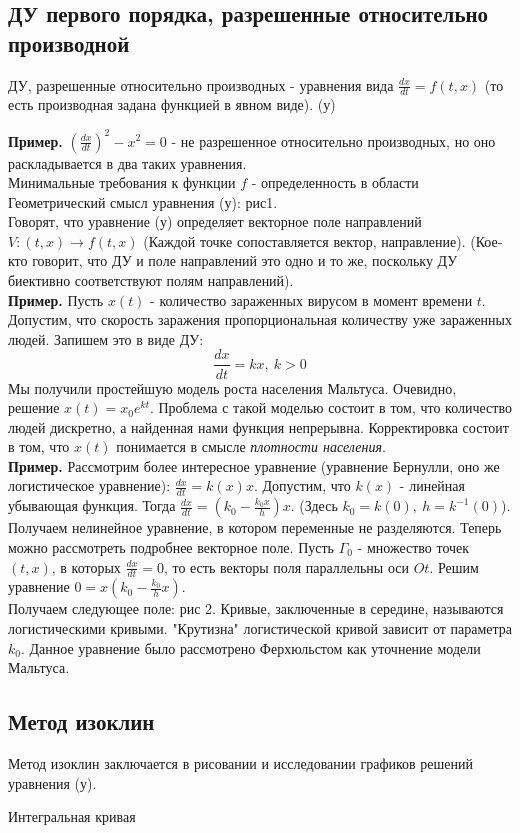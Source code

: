 \subsection{ДУ первого порядка, разрешенные относительно производной}
\begin{defin}
ДУ, разрешенные относительно производных - уравнения вида 
$\frac{dx}{dt}=f(t,x)$ (то есть производная задана функцией
в явном виде). (у)
\end{defin}
\textbf{Пример.} $(\frac{dx}{dt})^2-x^2=0$ - не разрешенное
относительно производных, но оно раскладывается в два таких уравнения. \\
Минимальные требования к функции $f$ - определенность в области\\
Геометрический смысл уравнения (у): рис1. \\
Говорят, что уравнение (у) определяет векторное поле направлений 
$V\colon(t,x)\to f(t,x)$ (Каждой точке сопоставляется вектор, направление). 
(Кое-кто говорит, что ДУ и поле направлений это одно и то же, поскольку
ДУ биективно соответствуют полям направлений).\\
\textbf{Пример.} Пусть $x(t)$ - количество зараженных вирусом
в момент времени $t$. Допустим, что скорость заражения пропорциональная
количеству уже зараженных людей. Запишем это в виде ДУ:
$$\frac{dx}{dt}=kx,~k>0$$
Мы получили простейшую модель роста населения Мальтуса. Очевидно, решение
$x(t)=x_0e^{kt}$. Проблема с такой моделью состоит в том, что количество 
людей дискретно, а найденная нами функция непрерывна. Корректировка состоит
в том, что $x(t)$ понимается в смысле \textit{плотности населения}. \\
\textbf{Пример.} Рассмотрим более интересное уравнение (уравнение Бернулли,
оно же логистическое уравнение): 
$\frac{dx}{dt}=k(x)x$. Допустим, что $k(x)$ - линейная убывающая функция. 
Тогда $\frac{dx}{dt}=(k_0-\frac{k_0x}{h})x$. (Здесь $k_0=k(0),~h=k^{-1}(0)$).
Получаем нелинейное уравнение, в котором переменные не разделяются. Теперь
можно рассмотреть подробнее векторное поле. Пусть $\Gamma_0$ - множество
точек  $(t,x)$, в которых  $\frac{dx}{dt}=0$, то есть векторы поля 
параллельны оси $Ot$. Решим уравнение  $0=x(k_0-\frac{k_0}{h}x)$. \\
Получаем следующее поле: рис 2. Кривые, заключенные в середине, называются
логистическими кривыми. "Крутизна" логистической кривой зависит от параметра 
$k_0$. Данное уравнение было рассмотрено Ферхюльстом как уточнение модели
Мальтуса. 


\subsection{Метод изоклин}
Метод изоклин заключается в рисовании и исследовании графиков решений 
уравнения (у). 
\begin{defin}
Интегральная кривая 
\end{defin}

